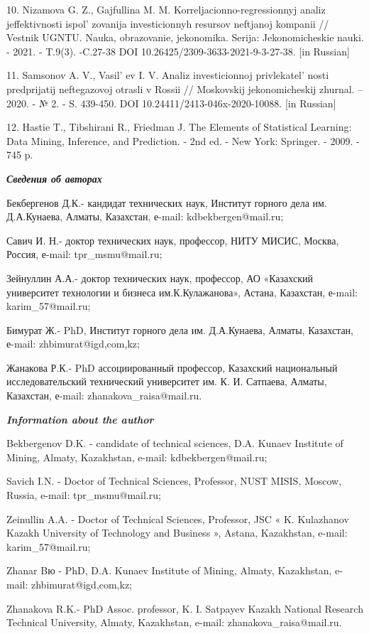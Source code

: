 \begin{refs}
10. Nizamova G. Z., Gajfullina M. M. Korreljacionno-regressionnyj analiz
jeffektivnosti ispol' zovanija investicionnyh resursov
neftjanoj kompanii // Vestnik UGNTU. Nauka, obrazovanie, jekonomika.
Serija: Jekonomicheskie nauki. - 2021. - T.9(3). -C.27-38 DOI
10.26425/2309-3633-2021-9-3-27-38. {[}in Russian{]}

11. Samsonov A. V., Vasil' ev I. V. Analiz investicionnoj
privlekatel' nosti predprijatij neftegazovoj otrasli v
Rossii // Moskovskij jekonomicheskij zhurnal. -- 2020. - № 2. - S.
439-450. DOI 10.24411/2413-046x-2020-10088. {[}in Russian{]}

12. Hastie T., Tibshirani R., Friedman J. The Elements of Statistical
Learning: Data Mining, Inference, and Prediction. - 2nd ed. - New York:
Springer. - 2009. - 745 p.
\end{refs}

\begin{info}
\hspace{1em}\emph{{\bfseries Сведения об авторах}}

Бекбергенов Д.К.- кандидат технических наук, Институт горного дела им.
Д.А.Кунаева, Алматы, Казахстан, е-mail: kdbekbergen@mail.ru;

Савич И. Н.- доктор технических наук, профессор, НИТУ МИСИС, Москва,
Россия, е-mail: tpr\_msmu@mail.ru;

Зейнуллин А.А.- доктор технических наук, профессор, АО «Казахский
университет технологии и бизнеса им.К.Кулажанова», Астана, Казахстан,
е-mail: karim\_57@mail.ru;

Бимурат Ж.- PhD, Институт горного дела им. Д.А.Кунаева, Алматы,
Казахстан, е-mail: zhbimurat@igd,com,kz;

Жанакова Р.К.- PhD ассоциированный профессор, Казахский национальный
исследовательский технический университет им. К. И. Сатпаева, Алматы,
Казахстан, е-mail: zhanakova\_raisa@mail.ru.

\hspace{1em}\emph{{\bfseries Information about the author}}

Bekbergenov D.K. - candidate of technical sciences, D.A. Kunaev
Institute of Mining, Almaty, Kazakhstan, e-mail: kdbekbergen@mail.ru;

Savich I.N. - Doctor of Technical Sciences, Professor, NUST MISIS,
Moscow, Russia, e-mail: tpr\_msmu@mail.ru;

Zeinullin A.A. - Doctor of Technical Sciences, Professor, JSC « K.
Kulazhanov Kazakh University of Technology and Business », Astana,
Kazakhstan, e-mail: karim\_57@mail.ru;

Zhanar Bю - PhD, D.A. Kunaev Institute of Mining, Almaty, Kazakhstan,
e-mail: zhbimurat@igd,com,kz;

Zhanakova R.K.- PhD Assoc. professor, K. I. Satpayev Kazakh National
Research Technical University, Almaty, Kazakhstan, e-mail:
zhanakova\_raisa@mail.ru.
\end{info}

